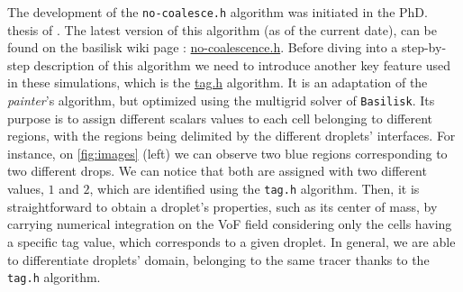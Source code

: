 The development of the \texttt{no-coalesce.h} algorithm was initiated in the PhD. thesis of \citet{mani2021numerical}.
The latest version of this algorithm (as of the current date), can be found on the basilisk wiki page : \href{http://basilisk.fr/sandbox/fintzin/Rising-Suspenion/no-coalescence.h}{no-coalescence.h}.
Before  diving into a step-by-step description of this algorithm we need to introduce another key feature used in these simulations, which is the \href{http://basilisk.fr/src/tag.h}{tag.h} algorithm. 
It is an adaptation of the \textit{painter}'s algorithm, but optimized using the multigrid solver of \texttt{Basilisk}. 
Its purpose is to assign different scalars values to each cell belonging to different regions, with the regions being delimited by the different droplets' interfaces. 
For instance, on \ref{fig:images} (left) we can observe two blue regions corresponding to two different drops.
We can notice that both are assigned with two different values, $1$ and $2$, which are identified using the \texttt{tag.h} algorithm. 
Then, it is straightforward to obtain a droplet's properties, such as its center of mass, by carrying numerical integration on the VoF field considering only the cells having a specific tag value, which corresponds to a given droplet.  
In general, we are able to differentiate droplets' domain, belonging to the same tracer thanks to the \texttt{tag.h} algorithm.


